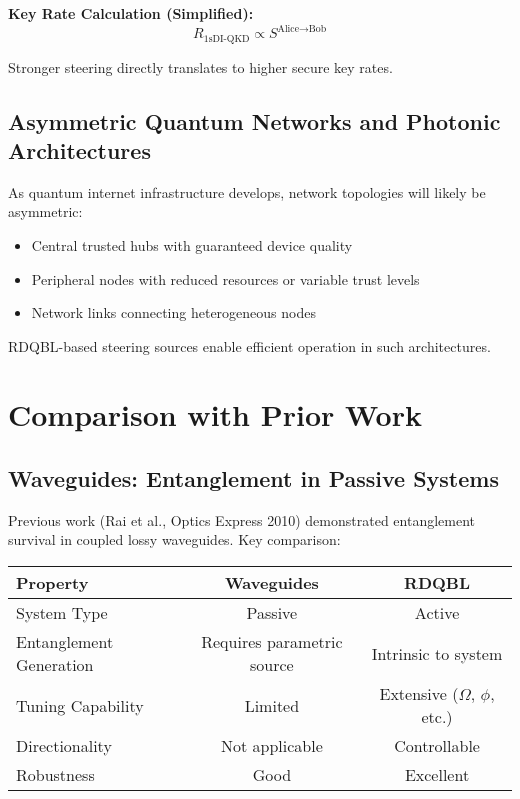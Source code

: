 \textbf{Key Rate Calculation (Simplified):}
\begin{equation}
R_{\text{1sDI-QKD}} \propto S^{\text{Alice} \to \text{Bob}}
\end{equation}

Stronger steering directly translates to higher secure key rates.

\subsection{Asymmetric Quantum Networks and Photonic Architectures}

As quantum internet infrastructure develops, network topologies will likely be asymmetric:
\begin{itemize}
	\item Central trusted hubs with guaranteed device quality
	\item Peripheral nodes with reduced resources or variable trust levels
	\item Network links connecting heterogeneous nodes
\end{itemize}

RDQBL-based steering sources enable efficient operation in such architectures.

\section{Comparison with Prior Work}

\subsection{Waveguides: Entanglement in Passive Systems}

Previous work (Rai et al., Optics Express 2010) demonstrated entanglement survival in coupled lossy waveguides. Key comparison:

\begin{table}[h]
\centering
\begin{tabular}{lcc}
\textbf{Property} & \textbf{Waveguides} & \textbf{RDQBL} \\
\hline
System Type & Passive & Active \\
Entanglement Generation & Requires parametric source & Intrinsic to system \\
Tuning Capability & Limited & Extensive ($\Omega$, $\phi$, etc.) \\
Directionality & Not applicable & Controllable \\
Robustness & Good & Excellent \\
\end{tabular}
\end{table}


